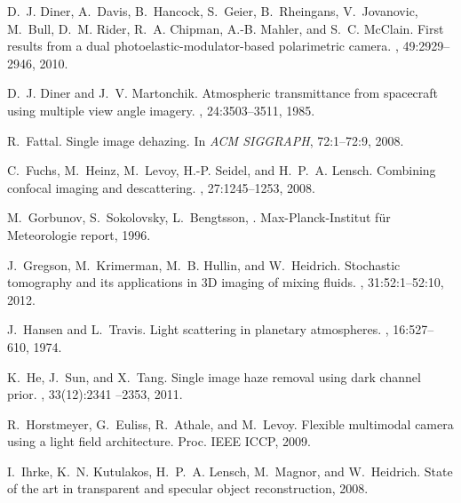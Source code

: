 \documentclass[10pt,twocolumn,letterpaper]{article}
\begin{document}
{\begin{thebibliography}{10}
D.~J. Diner, A.~Davis, B.~Hancock, S.~Geier, B.~Rheingans, V.~Jovanovic,
  M.~Bull, D.~M. Rider, R.~A. Chipman, A.-B. Mahler, and S.~C. McClain.
\newblock First results from a dual photoelastic-modulator-based polarimetric
  camera.
, 49:2929--2946, 2010.


D.~J. Diner and J.~V. Martonchik.
\newblock Atmospheric transmittance from spacecraft using multiple view angle
  imagery.
, 24:3503--3511, 1985.

R.~Fattal.
\newblock Single image dehazing.
\newblock In {\em ACM SIGGRAPH}, 72:1--72:9, 2008.

C.~Fuchs, M.~Heinz, M.~Levoy, H.-P. Seidel, and H.~P.~A. Lensch.
\newblock Combining confocal imaging and descattering.
, 27:1245--1253, 2008.

M.~Gorbunov, S.~Sokolovsky, L.~Bengtsson, %
.
\newblock Max-Planck-Institut f{\"u}r Meteorologie report, 1996.

J.~Gregson, M.~Krimerman, M.~B. Hullin, and W.~Heidrich.
\newblock Stochastic tomography and its applications in 3D imaging of mixing
  fluids.
, 31:52:1--52:10, 2012.

J.~Hansen and L.~Travis.
\newblock Light scattering in planetary atmospheres.
, 16:527--610, 1974.

K.~He, J.~Sun, and X.~Tang.
\newblock Single image haze removal using dark channel prior.
, 33(12):2341 --2353, 2011.

R.~Horstmeyer, G.~Euliss, R.~Athale, and M.~Levoy.
\newblock Flexible multimodal camera using a light field architecture.
\newblock Proc. IEEE ICCP, 2009.

I.~Ihrke, K.~N. Kutulakos, H.~P.~A. Lensch, M.~Magnor, and W.~Heidrich.
\newblock State of the art in transparent and specular object reconstruction,
  2008.


\end{thebibliography}}
\end{document}
